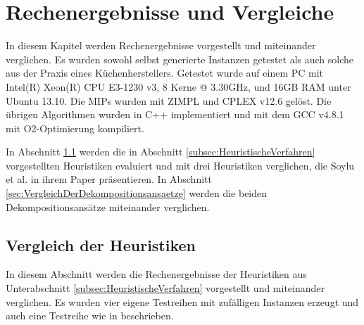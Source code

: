 \documentclass{scrreprt}
\begin{document}
\chapter{Rechenergebnisse und Vergleiche}
\label{chap:RechenergebnisseUndVergleiche}
In diesem Kapitel werden Rechenergebnisse vorgestellt und miteinander verglichen.
Es wurden sowohl selbst generierte Instanzen getestet als auch solche aus der Praxis eines Küchenherstellers.
Getestet wurde auf einem PC mit Intel(R) Xeon(R) CPU E3-1230 v3, 8 Kerne @ 3.30GHz, und 16GB RAM unter Ubuntu 13.10.
Die MIPs wurden mit ZIMPL \cite{Koch2004} und CPLEX v12.6 gelöst.
Die übrigen Algorithmen wurden in C++ implementiert und mit dem GCC v4.8.1 mit O2-Optimierung kompiliert.

In Abschnitt \ref{subsec:VergleichDerHeuristiken} werden die in Abschnitt \ref{subsec:HeuristischeVerfahren} vorgestellten Heuristiken evaluiert
und mit drei Heuristiken verglichen, die Soylu et al. in ihrem Paper \cite{soylu} präsentieren.
In Abschnitt \ref{sec:VergleichDerDekompositionsansaetze} werden die beiden Dekompositionsansätze miteinander verglichen.


\section{Vergleich der Heuristiken}
\label{subsec:VergleichDerHeuristiken}
In diesem Abschnitt werden die Rechenergebnisse der Heuristiken aus Unterabschnitt \ref{subsec:HeuristischeVerfahren} vorgestellt und miteinander verglichen.
Es wurden vier eigene Testreihen mit zufälligen Instanzen erzeugt und auch eine Testreihe wie in \cite{soylu} beschrieben. 
\end{document}
